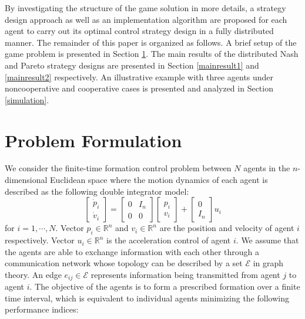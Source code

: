 \documentclass[10pt,doublecolumn]{IEEEtran}  %
\begin{document}
By investigating the structure of the game solution in more details, a strategy design approach as well as an implementation algorithm are proposed for each agent to carry out its optimal control strategy design in a fully distributed manner. The remainder of this paper is organized as follows. A brief setup of the game problem is presented in Section \ref{setup}. The main results of the distributed Nash and Pareto strategy designs are presented in Section \ref{mainresult1} and \ref{mainresult2} respectively. An illustrative example with three agents under noncooperative and cooperative cases is presented and analyzed in Section \ref{simulation}.


\section{Problem Formulation}\label{setup}
We consider the finite-time formation control problem between $N$ agents in the $n$-dimensional Euclidean space where the motion dynamics of each agent is described as the following double integrator model:
\begin{equation}
\begin{bmatrix}
\dot{p}_i\\ \dot{v}_i
\end{bmatrix}=\begin{bmatrix}
0&I_n\\0&0
\end{bmatrix}\begin{bmatrix}
p_i\\
v_i\end{bmatrix}+\begin{bmatrix}
0\\ I_n
\end{bmatrix}u_i\label{systemxi}
\end{equation}
for $i=1,\cdots,N$. Vector $p_i\in\mathbb{R}^n$ and $v_i\in\mathbb{R}^n$ are the position and velocity of agent $i$ respectively. Vector $u_i\in\mathbb{R}^{n}$ is the acceleration control of agent $i$. We assume that the agents are able to exchange information with each other through a communication network {whose topology can be described by a set $\mathcal{E}$ in graph theory. An edge $e_{ij}\in\mathcal{E}$ represents information being transmitted from agent $j$ to agent $i$}. The objective of the agents is to form a prescribed formation over a finite time interval, which is equivalent to individual agents minimizing the following performance indices:
\end{document}
